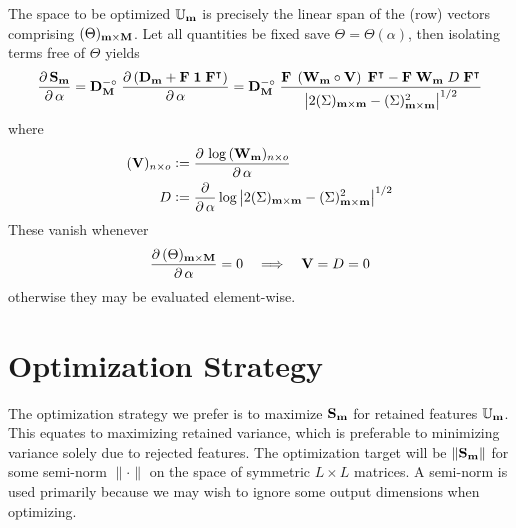 \documentclass[a4paper, margin=1in, reqno]{RAMArticle}
\begin{document}
	The space to be optimized \(\mathbb{U}_{\mathbf{m}}\) is precisely the linear span of the (row) vectors comprising \((\Theta)_{\mathbf{m} \times \mathbf{M}}\). Let all quantities be fixed save 
	\(\Theta = \Theta(\alpha)\), then isolating terms free of \(\Theta\) yields
	\begin{equation*}
		\frac{\partial\,\mathbf{S}_{\mathbf{m}}}{\partial\,\alpha}
		= \mathbf{D}_{\mathbf{M}}^{-\circ} \; 
			\frac{\partial\left(\mathbf{D}_{\mathbf{m}} + \mathbf{F}\; \mathbf{1} \;\mathbf{F}^{\intercal}\right)}
				{\partial\,\alpha}
		= \mathbf{D}_{\mathbf{M}}^{-\circ} \; \frac{
				\mathbf{F}\; \left(\mathbf{W}_{\mathbf{m}} \circ \mathbf{V}\right)\; \mathbf{F}^{\intercal}
				- \mathbf{F}\; \mathbf{W}_{\mathbf{m}}\; D \; \mathbf{F}^{\intercal}}
			{\left\lvert2(\Sigma)_{\mathbf{m}\times\mathbf{m}} - (\Sigma)_{\mathbf{m}\times\mathbf{m}}^{2}\right\rvert^{1/2}}
		\end{equation*}
	where
	\begin{align*}
 		(\mathbf{V})_{n \times o} &\mathrel{\mathop:}=
			\frac{\partial\,\log\,(\mathbf{W}_{\mathbf{m}})_{n \times o}} {\partial\,\alpha} \\
		D &\mathrel{\mathop:}=
			\frac{\partial}{\partial\,\alpha}
				\log\left\lvert2(\Sigma)_{\mathbf{m}\times\mathbf{m}} - (\Sigma)_{\mathbf{m}\times\mathbf{m}}^{2}\right\rvert^{1/2}
 	\end{align*}
	These vanish whenever
	\begin{equation*}
		\frac{\partial\,(\Theta)_{\mathbf{m}\times\mathbf{M}}}{\partial\,\alpha} = 0
		\quad \Longrightarrow \quad \mathbf{V} = D = 0
	\end{equation*}
	otherwise they may be evaluated element-wise.

\section{Optimization Strategy}
The optimization strategy we prefer is to maximize \(\mathbf{S}_{\mathbf{m}}\) for retained features \(\mathbb{U}_{\mathbf{m}}\).
This equates to maximizing retained variance, which is preferable to minimizing variance solely due to rejected features.
The optimization target will be \(\lVert\mathbf{S}_{\mathbf{m}}\rVert\) for some semi-norm \(\lVert\cdot\rVert\) on the space of symmetric \(L\times L\) matrices. 
A semi-norm is used primarily because we may wish to ignore some output dimensions when optimizing.
\end{document}
